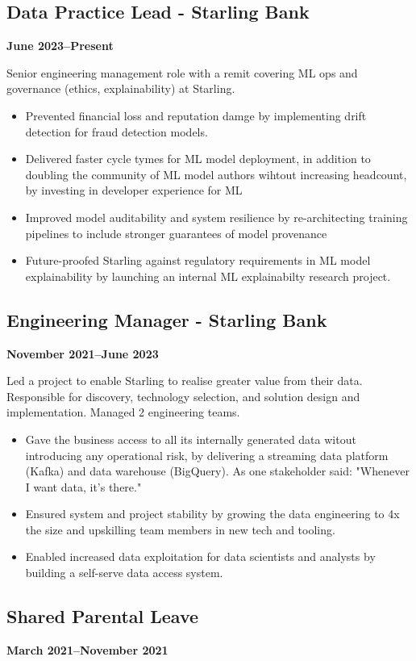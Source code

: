 \documentclass[a4paper]{scrartcl}
\begin{document}
\subsection*{Data Practice Lead - Starling Bank}
\textbf{June 2023--Present}

Senior engineering management role with a remit covering ML ops and governance (ethics,
explainability) at Starling.
\begin{itemize}
	\item Prevented financial loss and reputation damge by implementing
	      drift detection for fraud detection models.
	\item Delivered faster cycle tymes for ML model deployment, in addition to doubling the community of ML model authors wihtout increasing headcount, by investing in developer experience for ML
	\item Improved model auditability and system resilience by re-architecting training pipelines to include stronger guarantees of model provenance
	\item Future-proofed Starling against regulatory requirements in ML model explainability
	      by launching an internal ML explainabilty research project.
\end{itemize}

\subsection*{Engineering Manager - Starling Bank}
\textbf{November 2021--June 2023}

Led a project to enable Starling to realise greater value from their data. Responsible for discovery, technology selection, and solution design and implementation. Managed 2 engineering teams.
\begin{itemize}
	\item Gave the business access to all its internally generated data witout introducing any operational risk, by delivering a streaming data platform (Kafka) and data warehouse (BigQuery). As one stakeholder said: "Whenever I want data, it's there."
	\item Ensured system and project stability by growing the data engineering to 4x the size and upskilling team members in new tech and tooling.
	\item Enabled increased data exploitation for data scientists and analysts by building a self-serve data access system.
\end{itemize}

\subsection*{Shared Parental Leave}
\textbf{March 2021--November 2021}
\end{document}
